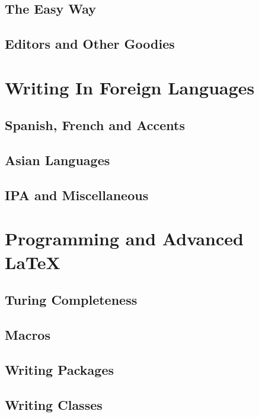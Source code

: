 \documentclass[12pt,a4paper]{article}
\begin{document}
\subsection{The Easy Way}

\subsection{Editors and Other Goodies}







\newpage
\section{Writing In Foreign Languages}

\subsection{Spanish, French and Accents}

\subsection{Asian Languages}

\subsection{IPA and Miscellaneous}

\newpage
\section{Programming and Advanced LaTeX}

\subsection{Turing Completeness}

\subsection{Macros}

\subsection{Writing Packages}

\subsection{Writing Classes}
\end{document}
